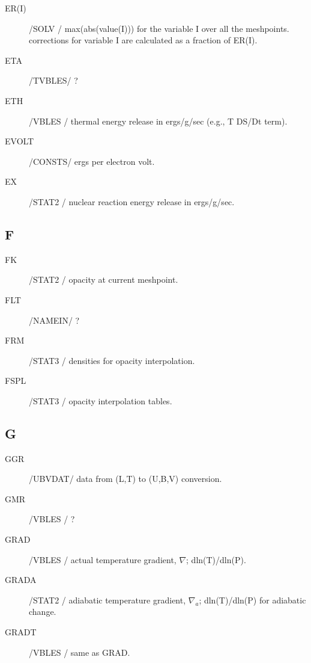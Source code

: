 \documentclass{article}
\begin{document}
\begin{description}
    \item[ER(I)]       /SOLV  / max(abs(value(I))) for the variable I over all the meshpoints.
     					 corrections for variable I are calculated as a fraction of ER(I).

	\item[ETA]     	/TVBLES/ ?
					
	\item[ETH]		    /VBLES / thermal  energy release in ergs/g/sec (e.g., T DS/Dt term).

	\item[EVOLT]		/CONSTS/ ergs per electron volt.

	\item[EX]		    /STAT2 / nuclear reaction energy release in ergs/g/sec.

\end{description}
\subsection*{F}
\begin{description}
	\item[FK]		    /STAT2 / opacity at current meshpoint.

	\item[FLT]     	/NAMEIN/ ?
	
	\item[FRM]     	/STAT3 / densities for opacity interpolation.

	\item[FSPL]    	/STAT3 / opacity interpolation tables.

\end{description}
\subsection*{G}
\begin{description}
	\item[GGR]     	/UBVDAT/ data from (L,T) to (U,B,V) conversion.

	\item[GMR]     	/VBLES / ?
	
	\item[GRAD]		/VBLES / actual temperature gradient, $\nabla$; dln(T)/dln(P).

	\item[GRADA]		/STAT2 / adiabatic temperature gradient, $\nabla_a$; dln(T)/dln(P) for adiabatic change.
	
	\item[GRADT]   	/VBLES / same as GRAD.
	
\end{description}
\end{document}
